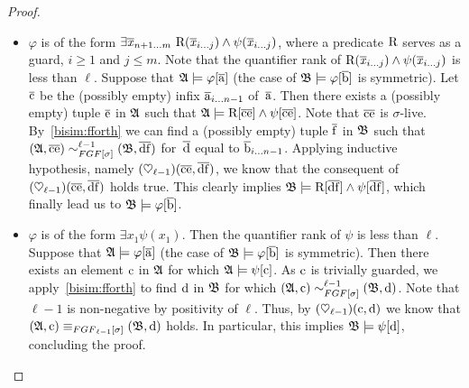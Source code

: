 \begin{proof}
\begin{itemize}
  \item $\varphi$ is of the form $\exists{\vartuplexfromto{n{+}1}{m}}\ \relR(\vartuplexfromto{i}{j}) \land \psi(\vartuplexfromto{i}{j})$, where a predicate $\mathrm{R}$ serves as a guard, $i \geq 1$ and $j \leq m$.
  Note that the quantifier rank of $\mathrm{R}(\overline{\mathit{x}}_{i\ldots j}) \land \psi(\overline{\mathit{x}}_{i\ldots j})$ is less than $\ell$.
  Suppose that ${\mathfrak{A}} \models \varphi[\overline{\mathrm{a}}]$ (the case of ${\mathfrak{B}} \models \varphi[\overline{\mathrm{b}}]$ is symmetric).
  Let $\overline{\mathrm{c}}$ be the (possibly empty) infix $\overline{\mathrm{a}}_{i\ldots n{-}1}$ of~$\overline{\mathrm{a}}$.
  Then there exists a (possibly empty) tuple $\overline{\mathrm{e}}$ in ${\mathfrak{A}}$ such that ${\mathfrak{A}} \models \mathrm{R}[\overline{\mathrm{c}}\overline{\mathrm{e}}] \land \psi[\overline{\mathrm{c}}\overline{\mathrm{e}}]$.
  Note that $\overline{\mathrm{c}}\overline{\mathrm{e}}$ is $\sigma$-live. 
  By~\ref{bisim:fforth} we can find a (possibly empty) tuple $\overline{\mathrm{f}}$ in ${\mathfrak{B}}$ such that $(\str{A}, \elemtuplec\elemtuplee) \bisimto_{\FGF[\sigma]}^{\ell{-}1} (\str{B}, \elemtupled\elemtuplef)$ for~$\overline{\mathrm{d}}$ equal to $\overline{\mathrm{b}}_{i\ldots n{-}1}$.
  Applying inductive hypothesis, namely $(\heartsuit_{\ell{-}1})(\overline{\mathrm{c}}\overline{\mathrm{e}},\overline{\mathrm{d}}\overline{\mathrm{f}})$, we know that the consequent of $(\heartsuit_{\ell{-}1})(\overline{\mathrm{c}}\overline{\mathrm{e}},\overline{\mathrm{d}}\overline{\mathrm{f}})$ holds true.
  This clearly implies ${\mathfrak{B}} \models \mathrm{R}[\overline{\mathrm{d}}\overline{\mathrm{f}}] \land \psi[\overline{\mathrm{d}}\overline{\mathrm{f}}]$, which finally lead us to ${\mathfrak{B}} \models \varphi[\overline{\mathrm{b}}]$.

  \item $\varphi$ is of the form $\exists{x_{1}} \psi(x_1)$. Then the quantifier rank of $\psi$ is less than $\ell$.
  Suppose that ${\mathfrak{A}} \models \varphi[\overline{\mathrm{a}}]$ (the case of ${\mathfrak{B}} \models \varphi[\overline{\mathrm{b}}]$ is symmetric).
  Then there exists an element $\mathrm{c}$ in ${\mathfrak{A}}$ for which ${\mathfrak{A}} \models \psi[\mathrm{c}]$.
  As $\mathrm{c}$ is trivially guarded, we apply~\ref{bisim:fforth} to find $\mathrm{d}$ in ${\mathfrak{B}}$ for which $(\str{A}, \elem{c}) \bisimto_{\FGF[\sigma]}^{\ell{-}1} (\str{B}, \elem{d})$.
  Note that $\ell{-}1$ is non-negative by positivity of $\ell$. 
  Thus, by $(\heartsuit_{\ell{-}1})(\mathrm{c},\mathrm{d})$ we know that $(\str{A}, \elem{c}) \equiv_{\FGF_{\ell{-}1}[\sigma]} (\str{B}, \elem{d})$ holds. 
  In particular, this implies ${\mathfrak{B}} \models \psi[\mathrm{d}]$, concluding the proof.
\end{itemize}


\end{proof}
